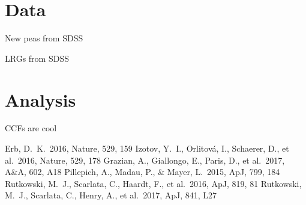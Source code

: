 \documentclass[12pt]{article}
\newcommand\apj{{ApJ}}
\newcommand\apjl{{ApJ}}
\newcommand\aap{{A\&A}}
\newcommand\nat{{Nature}}
\begin{document}
\section{Data}
New peas from SDSS

LRGs from SDSS
\section{Analysis}
CCFs are cool

%
%

\begin{thebibliography}{99}
 Erb, D.~K.\ 2016, \nat, 529, 159 
 Izotov, Y.~I., Orlitov{\'a}, I., Schaerer, D., et al.\ 2016, \nat, 529, 178 
 Grazian, A., Giallongo, E., Paris, D., et al.\ 2017, \aap, 602, A18 
 Pillepich, A., Madau, P., \& Mayer, L.\ 2015, \apj, 799, 184 
 Rutkowski, M.~J., Scarlata, C., Haardt, F., et al.\ 2016, \apj, 819, 81 
 Rutkowski, M.~J., Scarlata, C., Henry, A., et al.\ 2017, \apjl, 841, L27 



\end{thebibliography}


\label{lastpage}
\end{document}
